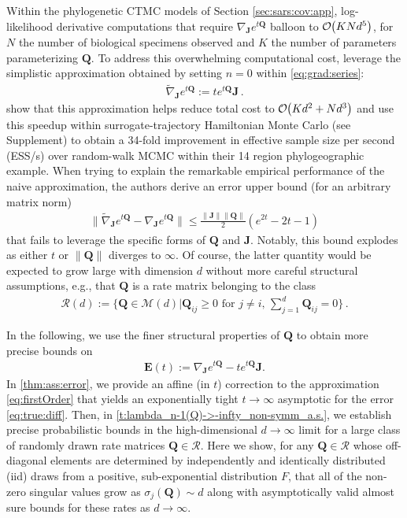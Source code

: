 \documentclass[9pt,twocolumn,twoside]{pnas-new}
\newcommand{\order}[1]{{\cal O}\hspace{-0.2em}\left( #1 \right)}
\newcommand{\?}{\textbf{?}}
\newcommand{\QQ}{\mathbf{Q}}
\newcommand{\JJ}{\mathbf{J}}
\newcommand{\Z}{\mathbf{E}}
\begin{document}
Within the phylogenetic CTMC models of Section \ref{sec:sars:cov:app}, log-likelihood derivative computations that require $\nabla_{\JJ} e^{t \QQ}$ balloon to $\order{KNd^5}$, for $N$ the number of biological specimens observed and $K$ the number of parameters parameterizing $\QQ$.
To address this overwhelming computational cost, \cite{magee2023random} leverage
the simplistic approximation obtained by setting $n=0$ within \eqref{eq:grad:series}:
\begin{align}\label{eq:firstOrder}
	\widetilde{\nabla}_{\JJ} e^{t\QQ} := t e^{t\QQ}\JJ   \, .
\end{align}
\cite{magee2023random} show that this approximation helps reduce total cost to $\order{Kd^2 + Nd^3}$ and use this speedup within
surrogate-trajectory Hamiltonian Monte Carlo (see Supplement) 
to obtain a
34-fold improvement in effective sample size per second (ESS/s) over
random-walk MCMC within their 14 region phylogeographic example.
When trying to explain the remarkable empirical performance of the naive
approximation, the authors derive an error upper
bound (for an arbitrary matrix norm)
\begin{align}\label{eq:initial:bnd}
  \lVert \widetilde{\nabla}_{\JJ}e^{t \QQ}  - \nabla_{\JJ} e^{t \QQ} \rVert
  \leq \frac{ \| \JJ \| \lVert\QQ \rVert }{2} (e^{2t} -2t-1) 
\end{align}
that fails to leverage the specific forms of $\QQ$ and $\JJ$.
Notably, this bound explodes as either $t$ or $\lVert \QQ \rVert$
diverges to $\infty$.  Of course, the latter quantity would be
expected to grow large with dimension $d$ without more careful
structural assumptions, e.g., that $\QQ$ is a rate matrix belonging to
the class
\begin{align}\label{eq:rate:mat}
  \mathcal{R}(d) :=
  \Big\{ \QQ \in {\mathcal M}(d) |
  \QQ_{ij} \geq 0 \text{ for } j \not= i ,\, \sum_{j =1}^d \QQ_{ij} = 0 \Big\} \, .
\end{align}

In the following, we use the finer structural properties of $\QQ$ to
obtain more precise bounds on
\begin{align}\label{eq:true:diff}
  \Z(t) := \nabla_\JJ e^{t \QQ} - t e^{t \QQ} \JJ.
\end{align}
In \cref{thm:ass:error}, we provide an affine (in $t$) correction to the 
approximation \eqref{eq:firstOrder} that yields an exponentially tight 
$t \to \infty$ asymptotic for the error \eqref{eq:true:diff}. Then, in 
\cref{t:lambda_n-1(Q)->-infty_non-symm_a.s.}, we establish
precise probabilistic bounds in the high-dimensional $d \to \infty$
limit for a large class of randomly drawn rate matrices
$\QQ \in \mathcal{R}$.  Here we show, for any $\QQ \in \mathcal{R}$
whose off-diagonal elements are determined by independently and identically distributed (iid) draws from a
positive, sub-exponential distribution $F$, that all of the non-zero
singular values grow as $\sigma_j(\QQ) \sim d$ along with
asymptotically valid almost sure bounds for these rates as
$d \to \infty$. 
\end{document}
